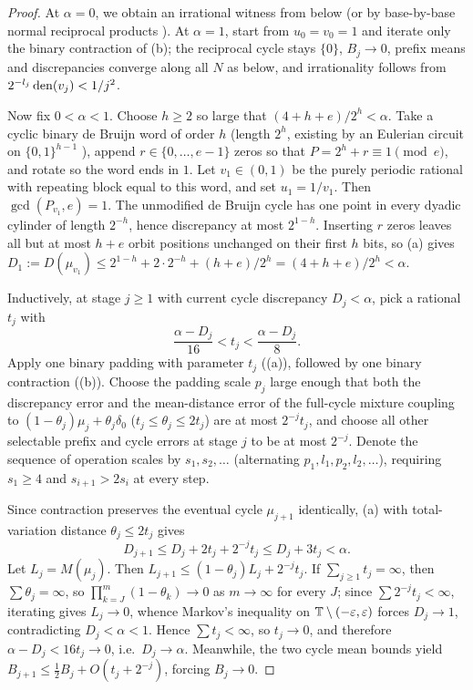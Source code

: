 \documentclass[11pt]{article}
\begin{document}
\begin{proof}
At $\alpha=0$, we obtain an irrational witness from  below (or by base-by-base normal reciprocal products \cite{PaperXIII}). At $\alpha=1$, start from $u_0=v_0=1$ and iterate only the binary contraction of (b); the reciprocal cycle stays $\{0\}$, $B_j\to0$, prefix means and discrepancies converge along all $N$ as below, and irrationality follows from $2^{-l_j}\operatorname{den}(v_j)<1/j^2$.

Now fix $0<\alpha<1$. Choose $h\ge2$ so large that $(4+h+e)/2^h<\alpha$. Take a cyclic binary de Bruijn word of order $h$ (length $2^h$, existing by an Eulerian circuit on $\{0,1\}^{h-1}$ \cite{deBruijn46}), append $r\in\{0,\dots,e-1\}$ zeros so that $P=2^h+r\equiv1\pmod e$, and rotate so the word ends in $1$. Let $v_1\in(0,1)$ be the purely periodic rational with repeating block equal to this word, and set $u_1=1/v_1$. Then $\gcd(P_{v_1},e)=1$. The unmodified de Bruijn cycle has one point in every dyadic cylinder of length $2^{-h}$, hence discrepancy at most $2^{1-h}$. Inserting $r$ zeros leaves all but at most $h+e$ orbit positions unchanged on their first $h$ bits, so (a) gives $D_1:=D(\mu_{v_1})\le 2^{1-h}+2\cdot2^{-h}+(h+e)/2^h=(4+h+e)/2^h<\alpha$.

Inductively, at stage $j\ge1$ with current cycle discrepancy $D_j<\alpha$, pick a rational $t_j$ with
\[
\frac{\alpha-D_j}{16}<t_j<\frac{\alpha-D_j}{8}.
\]
Apply one binary padding with parameter $t_j$ ((a)), followed by one binary contraction ((b)). Choose the padding scale $p_j$ large enough that both the discrepancy error and the mean-distance error of the full-cycle mixture coupling to $(1-\theta_j)\mu_j+\theta_j\delta_0$ ($t_j\le\theta_j\le 2t_j$) are at most $2^{-j}t_j$, and choose all other selectable prefix and cycle errors at stage $j$ to be at most $2^{-j}$. Denote the sequence of operation scales by $s_1,s_2,\dots$ (alternating $p_1,l_1,p_2,l_2,\dots$), requiring $s_1\ge4$ and $s_{i+1}>2s_i$ at every step.

Since contraction preserves the eventual cycle $\mu_{j+1}$ identically, (a) with total-variation distance $\theta_j\le 2t_j$ gives
\[
D_{j+1}\le D_j+2t_j+2^{-j}t_j\le D_j+3t_j<\alpha.
\]
Let $L_j=M(\mu_j)$. Then $L_{j+1}\le(1-\theta_j)L_j+2^{-j}t_j$. If $\sum_{j\ge1}t_j=\infty$, then $\sum\theta_j=\infty$, so $\prod_{k=J}^m(1-\theta_k)\to0$ as $m\to\infty$ for every $J$; since $\sum 2^{-j}t_j<\infty$, iterating gives $L_j\to0$, whence Markov's inequality on $\mathbb T\setminus(-\varepsilon,\varepsilon)$ forces $D_j\to1$, contradicting $D_j<\alpha<1$. Hence $\sum t_j<\infty$, so $t_j\to0$, and therefore $\alpha-D_j<16t_j\to0$, i.e.\ $D_j\to\alpha$. Meanwhile, the two cycle mean bounds yield $B_{j+1}\le\frac12 B_j+O(t_j+2^{-j})$, forcing $B_j\to0$.


\end{proof}
\end{document}
